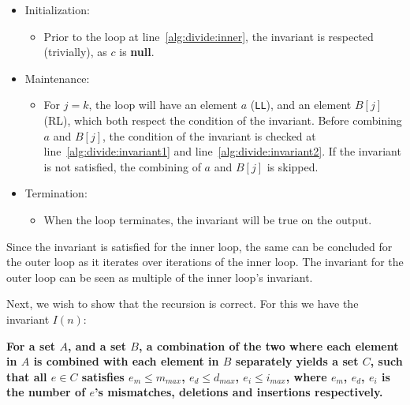 \documentclass[12pt]{article}
\theoremstyle{definition}
\begin{document}
\begin{itemize}
\item Initialization:
\begin{itemize}
	\item[] Prior to the loop at line~\ref{alg:divide:inner}, the invariant is respected (trivially), as $c$ is \textbf{null}.
\end{itemize}

\item Maintenance:
\begin{itemize}
	\item[] For $j = k$, the loop will have an element $a$ (\texttt{LL}), and an element $B[j]$ (RL), which both respect the condition of the invariant. Before combining $a$ and $B[j]$, the condition of the invariant is checked at line~\ref{alg:divide:invariant1} and line~\ref{alg:divide:invariant2}. If the invariant is not satisfied, the combining of $a$ and $B[j]$ is skipped.
\end{itemize}

\item Termination:
\begin{itemize}
	\item[] When the loop terminates, the invariant will be true on the output.
\end{itemize}
\end{itemize}

Since the invariant is satisfied for the inner loop, the same can be concluded for the outer loop as it iterates over iterations of the inner loop. The invariant for the outer loop can be seen as multiple of the inner loop's invariant.

Next, we wish to show that the recursion is correct. For this we have the invariant $I(n)$:

\textbf{For a set $A$, and a set $B$, a combination of the two where each element in $A$ is combined with each element in $B$ separately yields a set $C$, such that all $e \in C$ satisfies $e_m \leq m_{max}$, $e_d \leq d_{max}$, $e_i \leq i_{max}$, where $e_m$, $e_d$, $e_i$ is the number of $e$'s mismatches, deletions and insertions respectively.}
\end{document}
